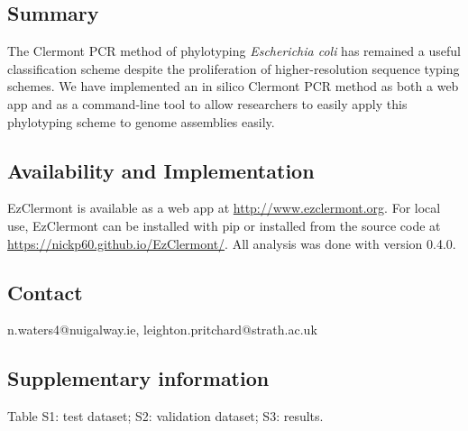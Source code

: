 
\subsection*{Summary}
The Clermont PCR method of phylotyping \textit{Escherichia coli} has remained a useful classification scheme despite the proliferation of higher-resolution sequence typing schemes. We have implemented an in silico Clermont PCR method as both a web app and as a command-line tool to allow researchers to easily apply this phylotyping scheme to genome assemblies easily.
\subsection*{Availability and Implementation}
EzClermont is available as a web app at  \url{http://www.ezclermont.org}.  For local use, EzClermont can be installed with pip or installed from the source code at \url{https://nickp60.github.io/EzClermont/}. All analysis was done with version 0.4.0.
\subsection*{Contact}
n.waters4@nuigalway.ie, leighton.pritchard@strath.ac.uk
\subsection*{Supplementary information}
Table S1: test dataset; S2: validation dataset; S3: results.
